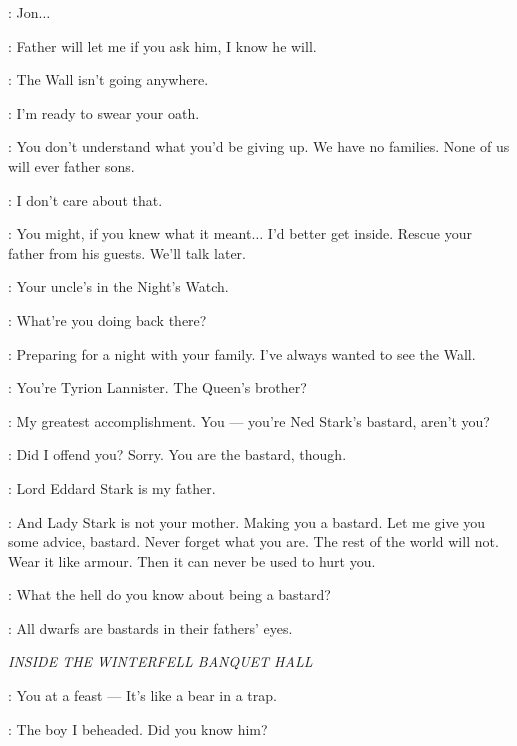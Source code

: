 \BENJEN: Jon$\ldots$ 

\JON: Father will let me if you ask him, I know he will. 

\BENJEN: The Wall isn't going anywhere. 

\JON: I'm ready to swear your oath. 

\BENJEN: You don't understand what you'd be giving up. We have no families. None of us will ever father sons. 

\JON: I don't care about that. 

\BENJEN: You might, if you knew what it meant$\ldots$ I'd better get inside. Rescue your father from his guests. We'll talk later. 


\TYRION: Your uncle's in the Night's Watch. 

\JON: What're you doing back there? 

\TYRION: Preparing for a night with your family. I've always wanted to see the Wall. 

\JON: You're Tyrion Lannister. The Queen's brother? 

\TYRION: My greatest accomplishment. You --- you're Ned Stark's bastard, aren't you? 


\TYRION: Did I offend you? Sorry. You are the bastard, though. 

\JON: Lord Eddard Stark is my father. 

\TYRION: And Lady Stark is not your mother. Making you a bastard. Let me give you some advice, bastard. Never forget what you are. The rest of the world will not. Wear it like armour. Then it can never be used to hurt you. 

\JON: What the hell do you know about being a bastard? 

\TYRION: All dwarfs are bastards in their fathers' eyes. 



\scene

\textit{INSIDE THE WINTERFELL BANQUET HALL} 


\BENJEN: You at a feast --- It's like a bear in a trap. 

\NED: The boy I beheaded. Did you know him? 

